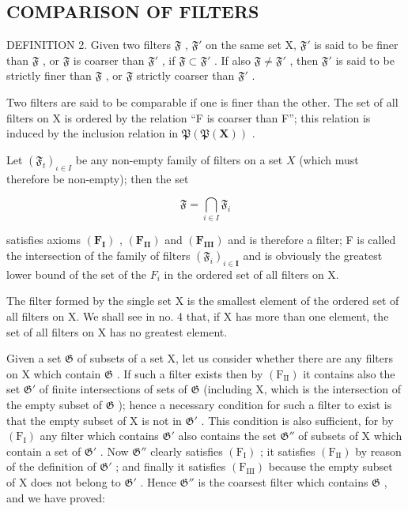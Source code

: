 \subsection{COMPARISON OF FILTERS}

DEFINITION 2. Given two filters \(\mathfrak{F}\) , \(\mathfrak{F}'\) on the same set X, \(\mathfrak{F}'\) is said to be finer than \(\mathfrak{F}\) , or \(\mathfrak{F}\) is coarser than \(\mathfrak{F}'\) , if \(\mathfrak{F} \subset \mathfrak{F}'\) . If also \(\mathfrak{F} \neq \mathfrak{F}'\) , then \(\mathfrak{F}'\) is said to be strictly finer than \(\mathfrak{F}\) , or \(\mathfrak{F}\) strictly coarser than \(\mathfrak{F}'\) .

Two filters are said to be comparable if one is finer than the other. The set of all filters on X is ordered by the relation ``F is coarser than F''; this relation is induced by the inclusion relation in \(\mathfrak{P}(\mathfrak{P}(\mathbf{X}))\) .

Let \((\mathfrak{F}_t)_{\iota \in I}\) be any non-empty family of filters on a set \(X\) (which must therefore be non-empty); then the set

\[
\mathfrak {F} = \bigcap_ {i \in I} \mathfrak {F} _ {i}
\]

satisfies axioms \((\mathbf{F}_{\mathbf{I}})\) , \((\mathbf{F}_{\mathbf{II}})\) and \((\mathbf{F}_{\mathbf{III}})\) and is therefore a filter; F is called the intersection of the family of filters \((\mathfrak{F}_{i})_{i\in\mathbf{I}}\) and is obviously the greatest lower bound of the set of the \(F_{i}\) in the ordered set of all filters on X.

The filter formed by the single set X is the smallest element of the ordered set of all filters on X. We shall see in no. 4 that, if X has more than one element, the set of all filters on X has no greatest element.

Given a set \(\mathfrak{G}\) of subsets of a set X, let us consider whether there are any filters on X which contain \(\mathfrak{G}\) . If such a filter exists then by \((\mathrm{F}_{\mathrm{II}})\) it contains also the set \(\mathfrak{G}'\) of finite intersections of sets of \(\mathfrak{G}\) (including X, which is the intersection of the empty subset of \(\mathfrak{G}\) ); hence a necessary condition for such a filter to exist is that the empty subset of X is not in \(\mathfrak{G}'\) . This condition is also sufficient, for by \((\mathrm{F}_{\mathrm{I}})\) any filter which contains \(\mathfrak{G}'\) also contains the set \(\mathfrak{G}''\) of subsets of X which contain a set of \(\mathfrak{G}'\) . Now \(\mathfrak{G}''\) clearly satisfies \((\mathrm{F}_{\mathrm{I}})\) ; it satisfies \((\mathrm{F}_{\mathrm{II}})\) by reason of the definition of \(\mathfrak{G}'\) ; and finally it satisfies \((\mathrm{F}_{\mathrm{III}})\) because the empty subset of X does not belong to \(\mathfrak{G}'\) . Hence \(\mathfrak{G}''\) is the coarsest filter which contains \(\mathfrak{G}\) , and we have proved:

